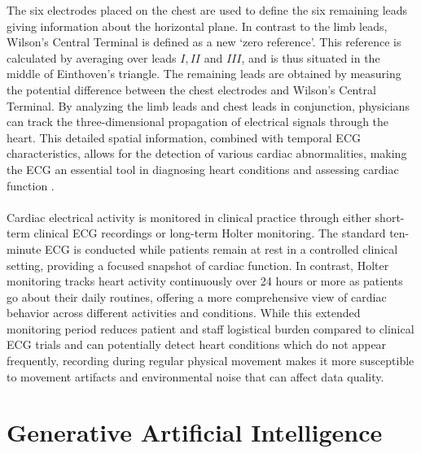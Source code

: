 \noindent The six electrodes placed on the chest are used to define the six remaining leads giving information about the horizontal plane. In contrast to the limb leads, Wilson's Central Terminal is defined as a new `zero reference'. This reference is calculated by averaging over leads \(I, II\) and \(III\), and is thus situated in the middle of Einthoven's triangle. The remaining leads are obtained by measuring the potential difference between the chest electrodes and Wilson's Central Terminal.
By analyzing the limb leads and chest leads in conjunction, physicians can track the three-dimensional propagation of electrical signals through the heart. This detailed spatial information, combined with temporal ECG characteristics, allows for the detection of various cardiac abnormalities, making the ECG an essential tool in diagnosing heart conditions and assessing cardiac function \cite{m.rangayyanBiomedicalSignalAnalysis2002}. 
\\ \\
Cardiac electrical activity is monitored in clinical practice through either short-term clinical ECG recordings or long-term Holter monitoring. The standard ten-minute ECG is conducted while patients remain at rest in a controlled clinical setting, providing a focused snapshot of cardiac function. In contrast, Holter monitoring tracks heart activity continuously over 24 hours or more as patients go about their daily routines, offering a more comprehensive view of cardiac behavior across different activities and conditions. While this extended monitoring period reduces patient and staff logistical burden compared to clinical ECG trials and can potentially detect heart conditions which do not appear frequently, recording during regular physical movement makes it more susceptible to movement artifacts and environmental noise that can affect data quality.


\section{Generative Artificial Intelligence}

